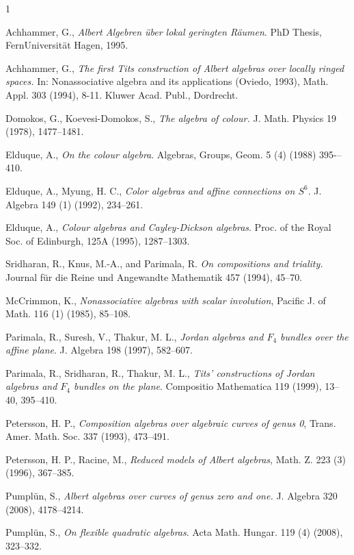 \documentclass[10pt]{amsart}
\theoremstyle{plain}
\theoremstyle{definition}
\begin{document}
\begin{thebibliography}{1}


 Achhammer, G.,  {\it Albert Algebren \"{u}ber lokal geringten R\"{a}umen}. PhD Thesis, FernUniversit\"{a}t
Hagen, 1995.

 Achhammer, G.,  {\it The first Tits construction of Albert algebras over locally ringed spaces.}
In: Nonassociative algebra and its applications (Oviedo, 1993), Math. Appl. 303
 (1994), 8-11.  Kluwer Acad. Publ., Dordrecht.


 Domokos, G., Koevesi-Domokos, S., \emph{The algebra of colour.} J. Math. Physics 19 (1978), 1477--1481.

 Elduque, A., {\it On the colour algebra}. Algebras, Groups, Geom. 5 (4) (1988) 395-–410.

  Elduque, A., Myung, H. C., \emph{Color algebras and affine connections on $S^6$}. J. Algebra 149 (1) (1992), 234--261.

 Elduque, A., {\it Colour algebras and Cayley-Dickson algebras}.
Proc. of the Royal Soc. of Edinburgh, 125A (1995), 1287--1303.

  Sridharan, R., Knus, M.-A., and Parimala, R. \emph{On compositions and triality.} Journal f\"ur die Reine und Angewandte Mathematik 457 (1994), 45--70.

 McCrimmon, K., {\it Nonassociative algebras with scalar
involution}, Pacific J. of Math. 116 (1) (1985), 85--108.

 Parimala, R., Suresh, V., Thakur, M. L., {\it Jordan algebras and $F_4$ bundles over the affine
plane}. J. Algebra 198 (1997), 582--607.

 Parimala, R., Sridharan, R., Thakur, M. L., {\it Tits' constructions of Jordan algebras and $F_4$
 bundles on the plane}. Compositio Mathematica 119 (1999), 13--40, 395--410.

 Petersson, H. P., {\it Composition algebras over algebraic curves
of genus 0}, Trans. Amer. Math. Soc. 337 (1993), 473--491.

 Petersson, H. P., Racine, M., {\it Reduced models of Albert algebras},
 Math. Z. 223 (3) (1996), 367--385.

 Pumpl\"un, S., {\it Albert algebras over curves of genus zero and one.}
 J. Algebra 320 (2008), 4178--4214.

 Pumpl\"un, S., {\it On flexible quadratic algebras}. Acta Math. Hungar. 119 (4) (2008), 323--332.


\end{thebibliography}
\end{document}
